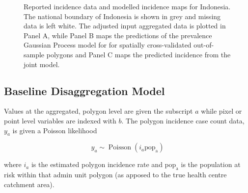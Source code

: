 \documentclass{statsoc}
\begin{document}
\begin{figure}[h!]
\caption{\label{predobsmapidn}
Reported incidence data and modelled incidence maps for Indonesia. 
The national boundary of Indonesia is shown in grey and missing data is left white.
The adjusted input aggregated data is plotted in Panel A, while Panel B maps the predictions of the prevalence Gaussian Process model for for spatially cross-validated out-of-sample polygons and Panel C maps the predicted incidence from the joint model.
}
\end{figure}



\subsection*{Baseline Disaggregation Model}

Values at the aggregated, polygon level are given the subscript $a$ while pixel or point level variables are indexed with $b$.
The polygon incidence case count data, $y_a$ is given a Poisson likelihood

$$y_a \sim \operatorname{Poisson}(i_a\mathrm{pop_a})$$

where $i_a$ is the estimated polygon incidence rate and $\mathrm{pop_a}$ is the population at risk within that admin unit polygon (as apposed to the true health centre catchment area).
\end{document}
